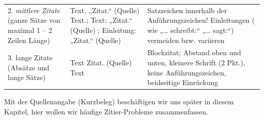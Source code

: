 \documentclass[]{book}
\theoremstyle{definition}
\theoremstyle{definition}
\theoremstyle{definition}
\theoremstyle{remark}
\begin{document}
\begin{longtable}[]{@{}lll@{}}
\begin{minipage}[t]{0.25\columnwidth}\raggedright\strut
2. \emph{mittlere Zitate} (ganze Sätze von maximal 1 -- 2 Zeilen
Länge)\strut
\end{minipage} & \begin{minipage}[t]{0.34\columnwidth}\raggedright\strut
Text. „Zitat.`` (Quelle) Text.; Text: „Zitat.`` (Quelle) ; Einleitung:
„Zitat.`` (Quelle)\strut
\end{minipage} & \begin{minipage}[t]{0.32\columnwidth}\raggedright\strut
Satzzeichen innerhalb der Anführungszeichen! Einleitungen ( wie
„\ldots{} schreibt:`` „\ldots{} sagt:``) vermeiden bzw. variieren
\vspace{-6mm}\strut
\end{minipage}\tabularnewline
\begin{minipage}[t]{0.25\columnwidth}\raggedright\strut
3. lange Zitate (Absätze und lange Sätze)\strut
\end{minipage} & \begin{minipage}[t]{0.34\columnwidth}\raggedright\strut
Text Zitat. (Quelle) Text\strut
\end{minipage} & \begin{minipage}[t]{0.32\columnwidth}\raggedright\strut
Blockzitat; Abstand oben und unten, kleinere Schrift (2 Pkt.), keine
Anführungszeichen, beidseitige Einrückung\strut
\end{minipage}\tabularnewline
\bottomrule
\end{longtable}

Mit der Quellenangabe (Kurzbeleg) beschäftigen wir uns später in diesem
Kapitel, hier wollen wir häufige Zitier-Probleme zusammenfassen.
\end{document}
